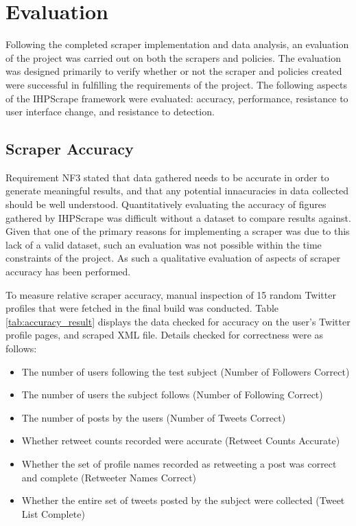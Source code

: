 \chapter{Evaluation}\label{C:us}

Following the completed scraper implementation and data analysis, an evaluation of the project was carried out on both the scrapers and policies. The evaluation was designed primarily to verify whether or not the scraper and policies created were successful in fulfilling the requirements of the project. The following aspects of the IHPScrape framework were evaluated: accuracy, performance, resistance to user interface change, and  resistance to detection. 

\section{Scraper Accuracy}

Requirement NF3 stated that data gathered needs to be accurate in order to generate meaningful results, and that any potential innacuracies in data collected should be well understood. Quantitatively evaluating the accuracy of figures gathered by IHPScrape was difficult without a dataset to compare results against. Given that one of the primary reasons for implementing a scraper was due to this lack of a valid dataset, such an evaluation was not possible within the time constraints of the project. As such a qualitative evaluation of aspects of scraper accuracy has been performed.

To measure relative scraper accuracy, manual inspection of 15 random Twitter profiles that were fetched in the final build was conducted. Table \ref{tab:accuracy_result} displays the data checked for accuracy on the user's Twitter profile pages, and scraped XML file. Details checked for correctness were as follows:

\begin{itemize}
 \item The number of users following the test subject (Number of Followers Correct)
 \item The number of users the subject follows (Number of Following Correct)
 \item The number of posts by the users (Number of Tweets Correct)
 \item Whether retweet counts recorded were accurate (Retweet Counts Accurate)
 \item Whether the set of profile names recorded as retweeting a post was correct and complete (Retweeter Names Correct)
 \item Whether the entire set of tweets posted by the subject were collected (Tweet List Complete)
\end{itemize}

